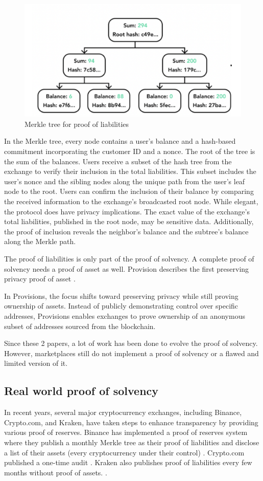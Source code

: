 \begin{figure}[H]
\centering
\includegraphics[width=130mm]{MerkleTreeLiabilities.png}
\caption{Merkle tree for proof of liabilities}
\label{overflow}
\end{figure}


In the Merkle tree, every node contains a user's balance and a hash-based commitment incorporating the customer ID and a nonce. The root of the tree is the sum of the balances.
Users receive a subset of the hash tree from the exchange to verify their inclusion in the total liabilities. This subset includes the user's nonce and the sibling nodes along the unique path from the user's leaf node to the root.
Users can confirm the inclusion of their balance by comparing the received information to the exchange's broadcasted root node.
While elegant, the protocol does have privacy implications. The exact value of the exchange's total liabilities, published in the root node, may be sensitive data.
Additionally, the proof of inclusion reveals the neighbor's balance and the subtree's balance along the Merkle path.

The proof of liabilities is only part of the proof of solvency. A complete proof of solvency needs a proof of asset as well.
Provision describes the first preserving privacy proof of asset \cite{DBBBCC15}.

In Provisions, the focus shifts toward preserving privacy while still proving ownership of assets.
Instead of publicly demonstrating control over specific addresses, Provisions enables exchanges to prove ownership of an anonymous subset of addresses sourced from the blockchain.

Since these 2 papers, a lot of work has been done to evolve the proof of solvency. However, marketplaces still do not implement a proof of solvency or a flawed and limited version of it.


\subsection{Real world proof of solvency}
In recent years, several major cryptocurrency exchanges, including Binance, Crypto.com, and Kraken, have taken steps to enhance transparency by providing various proof of reserves.
Binance has implemented a proof of reserves system where they publish a monthly Merkle tree as their proof of liabilities and disclose a list of their assets (every cryptocurrency under their control) \cite{BPR}.
Crypto.com published a one-time audit \cite{CC22}.
Kraken also publishes proof of liabilities every few months without proof of assets. \cite{KK23}.

